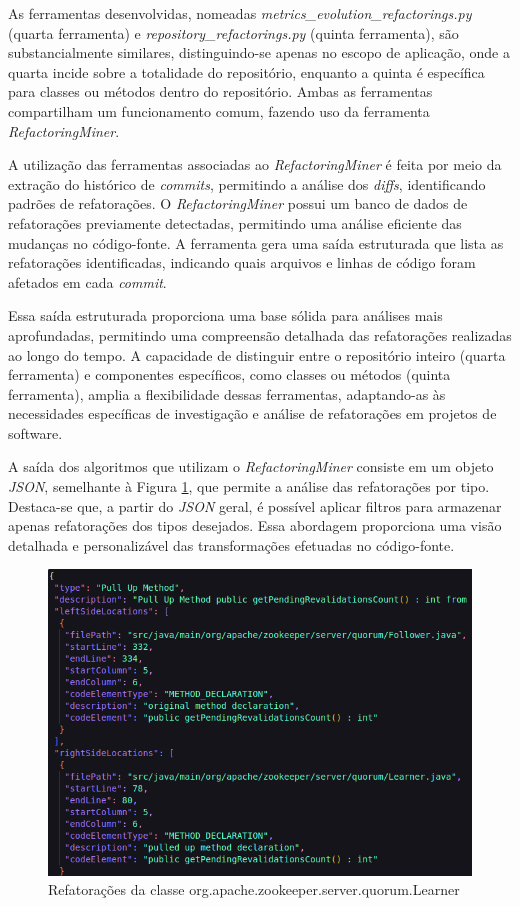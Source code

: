 As ferramentas desenvolvidas, nomeadas \textit{metrics\_evolution\_refactorings.py}\cite{RefactoringMiner:RepositoryRefactorings:2023} (quarta ferramenta) e \textit{repository\_refactorings.py}\cite{RefactoringMiner:MetricsEvolution:2023} (quinta ferramenta),  são substancialmente similares, distinguindo-se apenas no escopo de aplicação, onde a quarta  incide sobre a totalidade do repositório, enquanto a quinta é específica para classes ou métodos dentro do repositório. Ambas as ferramentas compartilham um funcionamento comum, fazendo uso da ferramenta \textit{RefactoringMiner}\cite{Tsantalis:ICSE:2018:RefactoringMiner}.

A utilização das ferramentas associadas ao \textit{RefactoringMiner} é feita por meio da extração do histórico de \textit{commits}, permitindo a análise dos \textit{diffs}, identificando padrões de refatorações. O \textit{RefactoringMiner} possui um banco de dados de refatorações previamente detectadas, permitindo uma análise eficiente das mudanças no código-fonte. A ferramenta gera uma saída estruturada que lista as refatorações identificadas, indicando quais arquivos e linhas de código foram afetados em cada \textit{commit}.

Essa saída estruturada proporciona uma base sólida para análises mais aprofundadas, permitindo uma compreensão detalhada das refatorações realizadas ao longo do tempo. A capacidade de distinguir entre o repositório inteiro (quarta ferramenta) e componentes específicos, como classes ou métodos (quinta ferramenta), amplia a flexibilidade dessas ferramentas, adaptando-as às necessidades específicas de investigação e análise de refatorações em projetos de software.

A saída dos algoritmos que utilizam o \textit{RefactoringMiner} consiste em um objeto \textit{JSON}, semelhante à Figura \ref{fig:RefactoringMinerOutput}, que permite a análise das refatorações por tipo. Destaca-se que, a partir do \textit{JSON} geral, é possível aplicar filtros para armazenar apenas refatorações dos tipos desejados. Essa abordagem proporciona uma visão detalhada e personalizável das transformações efetuadas no código-fonte.

\begin{figure}[h]
    \centering
    \includegraphics[width=0.8\linewidth]{figuras/Output/RefactoringMiner/org.apache.zookeeper.server.quorum.Learner.png}
    \caption{Refatorações da classe org.apache.zookeeper.server.quorum.Learner}
    \label{fig:RefactoringMinerOutput}
\end{figure}

